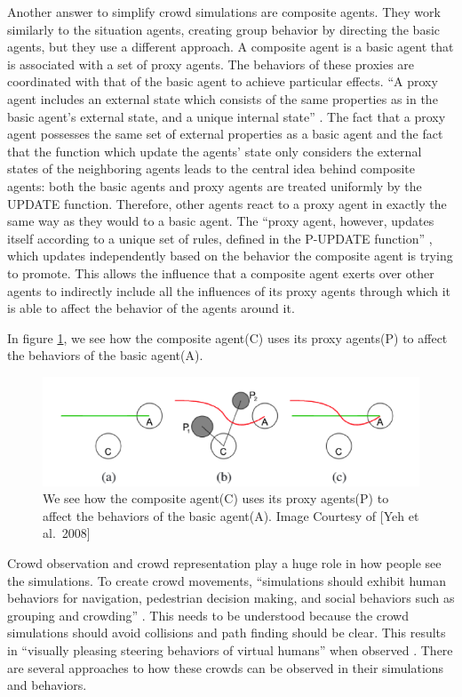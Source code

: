 \documentclass[tog]{acmsiggraph}
\begin{document}
Another answer to simplify crowd simulations are composite agents. They work similarly to the situation agents, creating group behavior by directing the basic agents, but they use a different approach. A composite agent is a basic agent that is associated with a set of proxy agents. The behaviors of these proxies are coordinated with that of the basic agent to achieve particular effects. ``A proxy agent includes an external state which consists of the same properties as in the basic agent’s external state, and a unique internal state'' \cite{yeh2008composite}. The fact that a proxy agent possesses the same set of external properties as a basic agent and the fact that the function which update the agents’ state only considers the external states of the neighboring agents leads to the central idea behind composite agents: both the basic agents and proxy agents are treated uniformly by the UPDATE function. Therefore, other agents react to a proxy agent in exactly the same way as they would to a basic agent. The ``proxy agent, however, updates itself according to a unique set of rules, defined in the P-UPDATE function'' \cite{yeh2008composite}, which updates independently based on the behavior the composite agent is trying to promote. This allows the influence that a composite agent exerts over other agents to indirectly include all the influences of its proxy agents through which it is able to affect the behavior of the agents around it. 

In figure \ref{fig:le}, we see how the composite agent(C) uses its proxy agents(P) to affect the behaviors of the basic agent(A).

\begin{figure}[ht]
\centering
\includegraphics[width=.50\textwidth]{images/leimage.png}
\caption{We see how the composite agent(C) uses its proxy agents(P) to affect the behaviors of the basic agent(A). Image Courtesy of [Yeh et al.\ 2008] }
  \label{fig:le}
\end{figure}

	Crowd observation and crowd representation play a huge role in how people see the simulations. To create crowd movements, ``simulations should exhibit human behaviors for navigation, pedestrian decision making, and social behaviors such as grouping and crowding'' \cite{park2013modeling}. This needs to be understood because the crowd simulations should avoid collisions and path finding should be clear. This results in ``visually pleasing steering behaviors of virtual humans'' when observed \cite{park2013modeling}. There are several approaches to how these crowds can be observed in their simulations and behaviors. 
	
\end{document}
